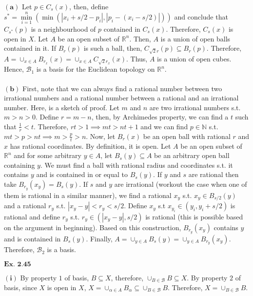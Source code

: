 \documentclass{article}
\begin{document}
$\mathbf{(a)}$ Let $p \in C_{s}(x)$, then, define $s^* = \min\limits_{i=1}^{n} (\min(|x_i+s/2-p_i|,|p_i-(x_i-s/2)|))$ and conclude that $C_{s^*}(p)$ is a neighbourhood of $p$ contained in $C_s(x)$. Therefore, $C_s(x)$ is open in $X$. Let $A$ be an open subset of $\mathbb{R}^n$. Then, $A$ is a union of open balls contained in it. If $B_{r}(p)$ is such a ball, then, $C_{\sqrt{2}r}(p) \subseteq B_{r}(p)$. Therefore, $A = \cup_{x\in A}B_{r_x}(x) = \cup_{x\in A}C_{\sqrt{2}r_x}(x)$. Thus, $A$ is a union of open cubes. Hence, $\mathcal{B}_1$ is a basis for the Euclidean topology on $\mathbb{R}^n$.\\~\\

$\mathbf{(b)}$ First, note that we can always find a rational number between two irrational numbers and a rational number between a rational and an irrational number. Here, is a sketch of proof. Let $m$ and $n$ are two irrational numbers s.t. $m > n > 0$. Define $r = m-n$, then, by Archimedes property, we can find a $t$ such that $\frac{1}{r} < t$. Therefore, $rt > 1 \implies mt > nt + 1$ and we can find $p \in \mathbb{N}$ s.t. $mt > p > nt \implies m > \frac{p}{t} > n$. Now, let $B_{r}(x)$ be an open ball with rational $r$ and $x$ has rational coordinates. By definition, it is open. Let $A$ be an open subset of $\mathbb{R}^n$ and for some arbitrary $y \in A$, let $B_{s}(y) \subseteq A$ be an arbitrary open ball containing $y$. We must find a ball with rational radius and coordinates s.t. it contains $y$ and is contained in or equal to $B_{s}(y)$. If $y$ and $s$ are rational then take $B_{r_y}(x_y) = B_{s}(y)$. If $s$ and $y$ are irrational (workout the case when one of them is rational in a similar manner), we find a rational $x_y$ s.t. $x_y \in B_{s/2}(y)$ and a rational $r_y$ s.t. $|x_y-y| < r_y < s/2$. Define $x_y$ s.t $x_{y_i} \in (y_i, y_i+s/2)$ is rational and define $r_y$ s.t. $r_y \in (|x_y-y|,s/2)$ is rational (this is possible based on the argument in beginning). Based on this construction, $B_{r_y}(x_y)$ contains $y$ and is contained in $B_{s}(y)$. Finally, $A = \cup_{y\in A}B_{s}(y) = \cup_{y \in A}B_{r_y}(x_y)$. Therefore, $\mathcal{B}_2$ is a basis.

\vspace{0.2in}

${\textbf{Ex. 2.45}}$

$\mathbf{(i)}$ By property $1$ of basis, $B \subseteq X$, therefore, $\cup_{B \in \mathcal{B}}B \subseteq X$. By property $2$ of basis, since $X$ is open in $X$, $X = \cup_{\alpha \in A}B_{\alpha} \subseteq \cup_{B \in \mathcal{B}} B$. Therefore, $X = \cup_{B \in \mathcal{B}} B$.\\~\\
\end{document}
